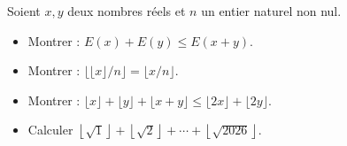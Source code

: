 Soient $x, y$ deux nombres réels et $n$ un entier naturel non nul.
\begin{itemize}
  \item Montrer : $E(x) + E(y) \leq E(x + y)$.
  \item Montrer : $\lfloor \lfloor x \rfloor / n \rfloor = \lfloor x/n \rfloor$.
  \item Montrer : $\lfloor x \rfloor + \lfloor y \rfloor + \lfloor x + y \rfloor \leq \lfloor 2x \rfloor + \lfloor 2y \rfloor$.
  \item Calculer $\left\lfloor \sqrt{1} \right\rfloor + \left\lfloor \sqrt{2} \right\rfloor + \cdots + \left\lfloor \sqrt{2026} \right\rfloor$.
\end{itemize}
